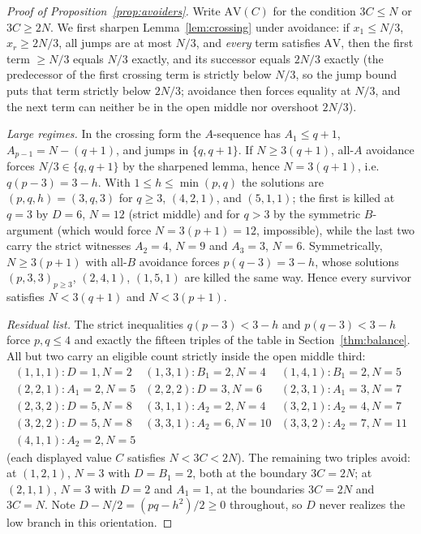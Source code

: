 \documentclass[11pt]{article}
\theoremstyle{definition}
\theoremstyle{remark}
\begin{document}
\begin{proof}[Proof of Proposition~\ref{prop:avoiders}]
Write $\mathrm{AV}(C)$ for the condition $3C\le N$ or $3C\ge2N$. We first sharpen
Lemma~\ref{lem:crossing} under avoidance: if $x_1\le N/3$, $x_r\ge2N/3$, all jumps are at
most $N/3$, and \emph{every} term satisfies $\mathrm{AV}$, then the first term
$\ge N/3$ equals $N/3$ exactly, and its successor equals $2N/3$ exactly (the predecessor
of the first crossing term is strictly below $N/3$, so the jump bound puts that term
strictly below $2N/3$; avoidance then forces equality at $N/3$, and the next term can
neither be in the open middle nor overshoot $2N/3$).

\emph{Large regimes.} In the crossing form the $A$-sequence has $A_1\le q+1$,
$A_{p-1}=N-(q+1)$, and jumps in $\{q,q+1\}$. If $N\ge3(q+1)$, all-$A$ avoidance forces
$N/3\in\{q,q+1\}$ by the sharpened lemma, hence $N=3(q+1)$, i.e.\ $q(p-3)=3-h$. With
$1\le h\le\min(p,q)$ the solutions are $(p,q,h)=(3,q,3)$ for $q\ge3$, $(4,2,1)$, and
$(5,1,1)$; the first is killed at $q=3$ by $D=6$, $N=12$ (strict middle) and for $q>3$
by the symmetric $B$-argument (which would force $N=3(p+1)=12$, impossible), while the
last two carry the strict witnesses $A_2=4$, $N=9$ and $A_3=3$, $N=6$. Symmetrically,
$N\ge3(p+1)$ with all-$B$ avoidance forces $p(q-3)=3-h$, whose solutions
$(p,3,3)_{p\ge3}$, $(2,4,1)$, $(1,5,1)$ are killed the same way. Hence every survivor
satisfies $N<3(q+1)$ and $N<3(p+1)$.

\emph{Residual list.} The strict inequalities $q(p-3)<3-h$ and $p(q-3)<3-h$ force
$p,q\le4$ and exactly the fifteen triples of the table in
Section~\ref{thm:balance}. All but two carry an eligible count strictly inside the open
middle third:
\[
\begin{array}{llllll}
(1,1,1)\!: D{=}1,N{=}2 & (1,3,1)\!: B_1{=}2,N{=}4 & (1,4,1)\!: B_1{=}2,N{=}5\\
(2,2,1)\!: A_1{=}2,N{=}5 & (2,2,2)\!: D{=}3,N{=}6 & (2,3,1)\!: A_1{=}3,N{=}7\\
(2,3,2)\!: D{=}5,N{=}8 & (3,1,1)\!: A_2{=}2,N{=}4 & (3,2,1)\!: A_2{=}4,N{=}7\\
(3,2,2)\!: D{=}5,N{=}8 & (3,3,1)\!: A_2{=}6,N{=}10 & (3,3,2)\!: A_2{=}7,N{=}11\\
(4,1,1)\!: A_2{=}2,N{=}5
\end{array}
\]
(each displayed value $C$ satisfies $N<3C<2N$). The remaining two triples avoid: at
$(1,2,1)$, $N=3$ with $D=B_1=2$, both at the boundary $3C=2N$; at $(2,1,1)$, $N=3$ with
$D=2$ and $A_1=1$, at the boundaries $3C=2N$ and $3C=N$. Note $D-N/2=(pq-h^2)/2\ge0$
throughout, so $D$ never realizes the low branch in this orientation.


\end{proof}
\end{document}

